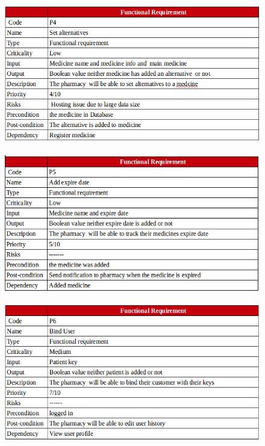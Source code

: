 \documentclass[]{article}
\begin{document}
\begin{figure}[H]
\centering
\includegraphics[scale=0.4]{./f/24}
\end{figure}

\begin{figure}[H]
\centering
\includegraphics[scale=0.4]{./f/25}
\end{figure}

\begin{figure}[H]
\centering
\includegraphics[scale=0.4]{./f/26}
\end{figure}
\end{document}
